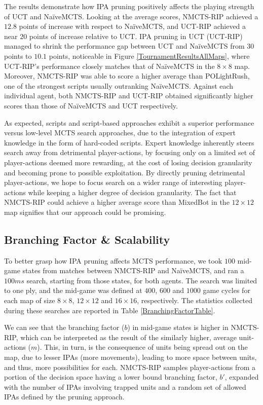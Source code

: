 \documentclass[conference]{IEEEtran}
\begin{document}
The results demonstrate how IPA pruning positively affects the playing strength of UCT and NaïveMCTS. Looking at the average scores, NMCTS-RIP achieved a $12.8$ points of increase with respect to NaïveMCTS, and UCT-RIP achieved a near $20$ points of increase relative to UCT. IPA pruning in UCT (UCT-RIP) managed to shrink the performance gap between UCT and NaïveMCTS from $30$ points to $10.1$ points, noticeable in Figure \ref{TournamentResultsAllMaps}, where UCT-RIP's performance closely matches that of NaïveMCTS in the $8\times8$ map. Moreover, NMCTS-RIP was able to score a higher average than POLightRush, one of the strongest scripts usually outranking NaïveMCTS. Against each individual agent, both NMCTS-RIP and UCT-RIP obtained significantly higher scores than those of NaïveMCTS and UCT respectively.

As expected, scripts and script-based approaches exhibit a superior performance versus low-level MCTS search approaches, due to the integration of expert knowledge in the form of hard-coded scripts. Expert knowledge inherently steers search away from detrimental player-actions, by focusing only on a limited set of player-actions deemed more rewarding, at the cost of losing decision granularity and becoming prone to possible exploitation. By directly pruning detrimental player-actions, we hope to focus search on a wider range of interesting player-actions while keeping a higher degree of decision granularity. The fact that NMCTS-RIP could achieve a higher average score than MixedBot in the $12\times12$ map signifies that our approach could be promising.


\subsection{Branching Factor \& Scalability}

To better grasp how IPA pruning affects MCTS performance, we took $100$ mid-game states from matches between NMCTS-RIP and NaïveMCTS, and ran a $100ms$ search, starting from those states, for both agents. The search was limited to one ply, 
and the mid-game was defined at $400$, $600$ and $1000$ game cycles for each map of size $8\times8$, $12\times12$ and $16\times16$, respectively. The statistics collected during these searches are reported in Table \ref{BranchingFactorTable}.

We can see that the branching factor ($b$) in mid-game states is higher in NMCTS-RIP, which can be interpreted as the result of the similarly higher, average unit-actions ($m$). This, in turn, is the consequence of units being spread out on the map, due to lesser IPAs (more movements), leading to more space between units, and thus, more possibilities for each. NMCTS-RIP samples player-actions from a portion of the decision space having a lower bound branching factor, $b'$, expanded with the number of IPAs involving trapped units and a random set of allowed IPAs defined by the pruning approach.
\end{document}
